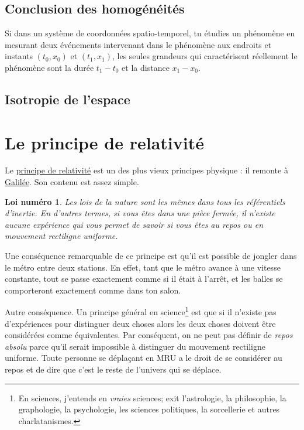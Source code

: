 \documentclass[a4paper,12pt]{book}
\newcounter{numloiphyz}
\theoremstyle{mes_exemples}	\newtheorem{exemple}[numtho]{Exemple}
\theoremstyle{mes_tho}
\newtheorem{loiphyz}[numloiphyz]{Loi numéro}
\begin{document}
\subsection{Conclusion des homogénéités}		\label{SecConcHomo}

Si dans un système de coordonnées spatio-temporel, tu étudies un phénomène en mesurant deux événements intervenant dans le phénomène aux endroits et instants $(t_0,x_0)$ et $(t_1,x_1)$, les seules grandeurs qui caractérisent réellement le phénomène sont la durée $t_1-t_0$ et la distance $x_1-x_0$.

\subsection{Isotropie de l'espace}


\section{Le principe de relativité}

Le \href{http://fr.wikipedia.org/wiki/Théorie_de_la_relativité}{principe de relativité} est un des plus vieux principes physique : il remonte à \href{http://fr.wikipedia.org/wiki/Relativité_galiléenne}{Galilée}. Son contenu est assez simple.
\begin{loiphyz}
Les lois de la nature sont les mêmes dans tous les référentiels d'inertie. En d'autres termes, si vous êtes dans une pièce fermée, il n'existe aucune expérience qui vous permet de savoir si vous êtes au repos ou en mouvement rectiligne uniforme.
\end{loiphyz}

Une conséquence remarquable de ce principe est qu'il est possible de jongler dans le métro entre deux stations. En effet, tant que le métro avance à une vitesse constante, tout se passe exactement comme si il était à l'arrêt, et les balles se comporteront exactement comme dans ton salon.

Autre conséquence. Un principe général en science\footnote{En sciences, j'entends en \emph{vraies} sciences; exit l'astrologie, la philosophie, la graphologie, la psychologie, les sciences politiques, la sorcellerie et autres charlatanismes.} est que si il n'existe pas d'expériences pour distinguer deux choses alors les deux choses doivent être considérées comme équivalentes. Par conséquent, on ne peut pas définir de \emph{repos absolu} parce qu'il serait impossible à distinguer du mouvement rectiligne uniforme. Toute personne se déplaçant en MRU a le droit de se considérer au repos et de dire que c'est le reste de l'univers qui se déplace.
\end{document}
